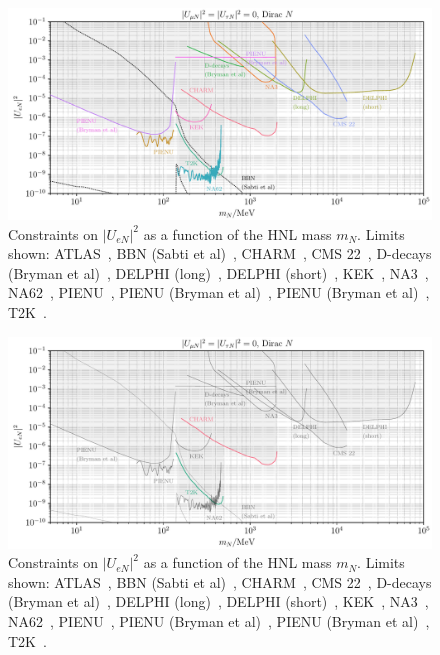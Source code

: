 \documentclass{revtex4-2}%
\begin{document}
%
\normalsize%


\begin{figure}[h!]%
\centering%
\includegraphics[width=1\textwidth]{../plots/UeN.pdf}%
\caption{Constraints on $|U_{e N}|^2$ as a function of the HNL mass $m_N$. Limits shown: ATLAS~\cite{ATLAS:2019kpx}, BBN (Sabti et al)~\cite{Sabti:2020yrt}, CHARM~\cite{CHARM:1985nku}, CMS 22~\cite{2201.05578}, D-decays (Bryman et al)~\cite{Bryman:2019bjg}, DELPHI (long)~\cite{DELPHI:1996qcc}, DELPHI (short)~\cite{DELPHI:1996qcc}, KEK~\cite{Asano:1981he,}, NA3~\cite{NA3:1986ahv}, NA62~\cite{NA62:2020mcv}, PIENU~\cite{Britton:1992xv}, PIENU (Bryman et al)~\cite{Bryman:2019bjg}, PIENU (Bryman et al)~\cite{Bryman:2019bjg}, T2K~\cite{T2K:2019jwa}.}%
\end{figure}

%


\begin{figure}[h!]%
\centering%
\includegraphics[width=1\textwidth]{../plots/UeN_nf03.pdf}%
\caption{Constraints on $|U_{e N}|^2$ as a function of the HNL mass $m_N$. Limits shown: ATLAS~\cite{ATLAS:2019kpx}, BBN (Sabti et al)~\cite{Sabti:2020yrt}, CHARM~\cite{CHARM:1985nku}, CMS 22~\cite{2201.05578}, D-decays (Bryman et al)~\cite{Bryman:2019bjg}, DELPHI (long)~\cite{DELPHI:1996qcc}, DELPHI (short)~\cite{DELPHI:1996qcc}, KEK~\cite{Asano:1981he,}, NA3~\cite{NA3:1986ahv}, NA62~\cite{NA62:2020mcv}, PIENU~\cite{Britton:1992xv}, PIENU (Bryman et al)~\cite{Bryman:2019bjg}, PIENU (Bryman et al)~\cite{Bryman:2019bjg}, T2K~\cite{T2K:2019jwa}.}%
\end{figure}
\end{document}
